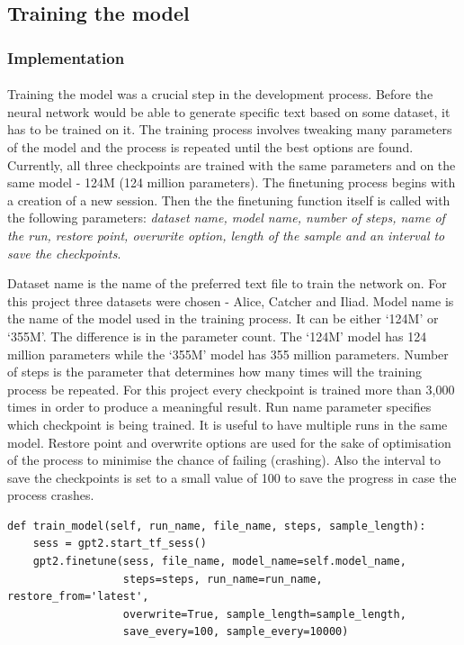 \documentclass[12pt]{report}
\newenvironment{code}{\captionsetup{type=listing}}{}
\begin{document}
\subsection*{Training the model}
\subsubsection*{Implementation}
\paragraph{}
Training the model was a crucial step in the development process. Before the neural network would
be able to generate specific text based on some dataset, it has to be trained on it. The training process involves
tweaking many parameters of the model and the process is repeated until the best options are found. Currently,
all three checkpoints are trained with the same parameters and on the same model - 124M (124 million parameters). 
The finetuning process begins with a creation of a new session. Then the the finetuning function itself is called
with the following parameters: \textit{dataset name, model name, number of steps, name of the run, restore point,
overwrite option, length of the sample and an interval to save the checkpoints}.

Dataset name is the name of the preferred text file to train the network on. For this project three datasets were
chosen - Alice, Catcher and Iliad. Model name is the name of the model used in the training process. It can be either
`124M' or `355M'. The difference is in the parameter count. The `124M' model has 124 million parameters while the
`355M' model has 355 million parameters. Number of steps is the parameter that determines how many times will the
training process be repeated. For this project every checkpoint is trained more than 3,000 times in order to
produce a meaningful result. Run name parameter specifies which checkpoint is being trained. It is useful to have
multiple runs in the same model. Restore point and overwrite options are used for the sake of optimisation of the
process to minimise the chance of failing (crashing). Also the interval to save the checkpoints is set to a small
value of 100 to save the progress in case the process crashes.

\begin{code}
\begin{verbatim}
def train_model(self, run_name, file_name, steps, sample_length):
    sess = gpt2.start_tf_sess()
    gpt2.finetune(sess, file_name, model_name=self.model_name,
                  steps=steps, run_name=run_name, restore_from='latest',
                  overwrite=True, sample_length=sample_length,
                  save_every=100, sample_every=10000)
\end{verbatim}
\end{code}
\end{document}
